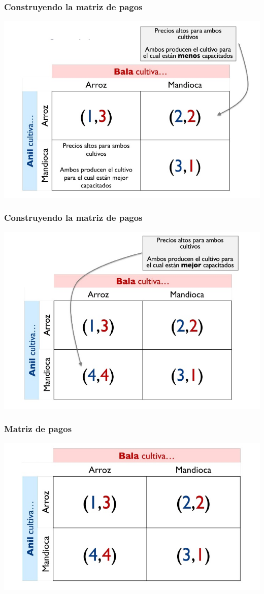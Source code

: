 \documentclass{beamer}
\begin{document}
\begin{frame}
\frametitle{ Construyendo la matriz de pagos}
\centering
\includegraphics[scale=0.6]{Slides Principios de Economia/Figures/Tema_03_10_bala.jpg}
\end{frame}

\begin{frame}
\frametitle{Construyendo la matriz de pagos}
\centering
\includegraphics[scale=0.6]{Slides Principios de Economia/Figures/Tema_03_11_bala.jpg}
\end{frame}

\begin{frame}
\frametitle{Matriz de pagos}
\centering
\includegraphics[scale=0.6]{Slides Principios de Economia/Figures/Tema_03_12_bala.jpg}
\end{frame}
\end{document}
